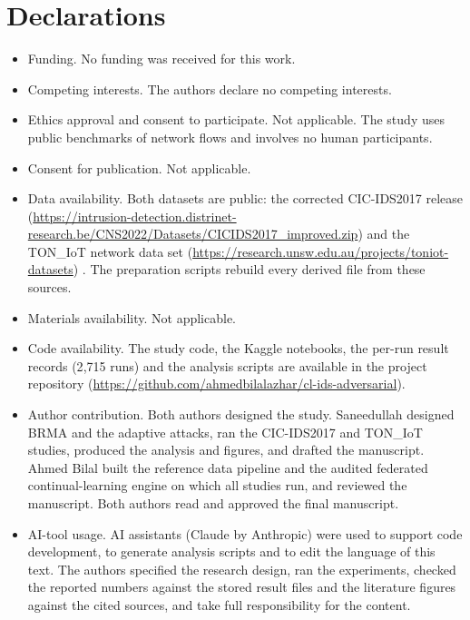 \documentclass[pdflatex,sn-mathphys-num]{sn-jnl}
\theoremstyle{thmstyleone}
\theoremstyle{thmstylethree}
\begin{document}
\section*{Declarations}
\begin{itemize}
\item Funding. No funding was received for this work.
\item Competing interests. The authors declare no competing interests.
\item Ethics approval and consent to participate. Not applicable. The study uses public benchmarks of network flows and involves no human participants.
\item Consent for publication. Not applicable.
\item Data availability. Both datasets are public: the corrected CIC-IDS2017 release (\url{https://intrusion-detection.distrinet-research.be/CNS2022/Datasets/CICIDS2017_improved.zip}) \cite{dataset,liu} and the TON\_IoT network data set (\url{https://research.unsw.edu.au/projects/toniot-datasets}) \cite{moustafa}. The preparation scripts rebuild every derived file from these sources.
\item Materials availability. Not applicable.
\item Code availability. The study code, the Kaggle notebooks, the per-run result records (2{,}715 runs) and the analysis scripts are available in the project repository (\url{https://github.com/ahmedbilalazhar/cl-ids-adversarial}).
\item Author contribution. Both authors designed the study. Saneedullah designed BRMA and the adaptive attacks, ran the CIC-IDS2017 and TON\_IoT studies, produced the analysis and figures, and drafted the manuscript. Ahmed Bilal built the reference data pipeline and the audited federated continual-learning engine on which all studies run, and reviewed the manuscript. Both authors read and approved the final manuscript.
\item AI-tool usage. AI assistants (Claude by Anthropic) were used to support code development, to generate analysis scripts and to edit the language of this text. The authors specified the research design, ran the experiments, checked the reported numbers against the stored result files and the literature figures against the cited sources, and take full responsibility for the content.
\end{itemize}


\end{document}
